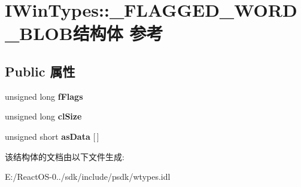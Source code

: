 \hypertarget{struct_i_win_types_1_1___f_l_a_g_g_e_d___w_o_r_d___b_l_o_b}{}\section{I\+Win\+Types\+:\+:\+\_\+\+F\+L\+A\+G\+G\+E\+D\+\_\+\+W\+O\+R\+D\+\_\+\+B\+L\+O\+B结构体 参考}
\label{struct_i_win_types_1_1___f_l_a_g_g_e_d___w_o_r_d___b_l_o_b}
\subsection*{Public 属性}
\begin{DoxyCompactItemize}
\item 
\mbox{\label{struct_i_win_types_1_1___f_l_a_g_g_e_d___w_o_r_d___b_l_o_b_a7aaee8e2179802411288a59b5cf466d3}} 
unsigned long {\bfseries f\+Flags}
\item 
\mbox{\label{struct_i_win_types_1_1___f_l_a_g_g_e_d___w_o_r_d___b_l_o_b_aae0e24a69e16ac5f2dcdc4bcda3a41ac}} 
unsigned long {\bfseries cl\+Size}
\item 
\mbox{\label{struct_i_win_types_1_1___f_l_a_g_g_e_d___w_o_r_d___b_l_o_b_a4f469f32803c2838701c32331afc9014}} 
unsigned short {\bfseries as\+Data} \mbox{[}$\,$\mbox{]}
\end{DoxyCompactItemize}


该结构体的文档由以下文件生成\+:\begin{DoxyCompactItemize}
\item 
E\+:/\+React\+O\+S-\/0../sdk/include/psdk/wtypes.\+idl\end{DoxyCompactItemize}
